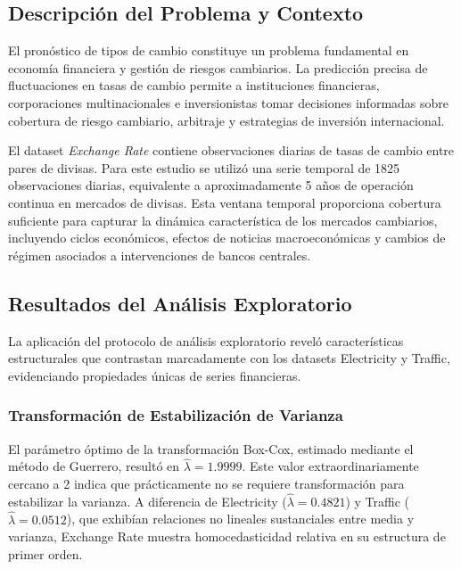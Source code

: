 \subsection{Descripción del Problema y Contexto}
\label{subsec:exchange_contexto}

El pronóstico de tipos de cambio constituye un problema fundamental en economía financiera y gestión de riesgos cambiarios. La predicción precisa de fluctuaciones en tasas de cambio permite a instituciones financieras, corporaciones multinacionales e inversionistas tomar decisiones informadas sobre cobertura de riesgo cambiario, arbitraje y estrategias de inversión internacional.

El dataset \textit{Exchange Rate} contiene observaciones diarias de tasas de cambio entre pares de divisas. Para este estudio se utilizó una serie temporal de 1825 observaciones diarias, equivalente a aproximadamente 5 años de operación continua en mercados de divisas. Esta ventana temporal proporciona cobertura suficiente para capturar la dinámica característica de los mercados cambiarios, incluyendo ciclos económicos, efectos de noticias macroeconómicas y cambios de régimen asociados a intervenciones de bancos centrales.

\subsection{Resultados del Análisis Exploratorio}
\label{subsec:exchange_eda_resultados}

La aplicación del protocolo de análisis exploratorio reveló características estructurales que contrastan marcadamente con los datasets Electricity y Traffic, evidenciando propiedades únicas de series financieras.

\subsubsection{Transformación de Estabilización de Varianza}

El parámetro óptimo de la transformación Box-Cox, estimado mediante el método de Guerrero, resultó en $\hat{\lambda} = 1.9999$. Este valor extraordinariamente cercano a 2 indica que prácticamente no se requiere transformación para estabilizar la varianza. A diferencia de Electricity ($\hat{\lambda} = 0.4821$) y Traffic ($\hat{\lambda} = 0.0512$), que exhibían relaciones no lineales sustanciales entre media y varianza, Exchange Rate muestra homocedasticidad relativa en su estructura de primer orden.

